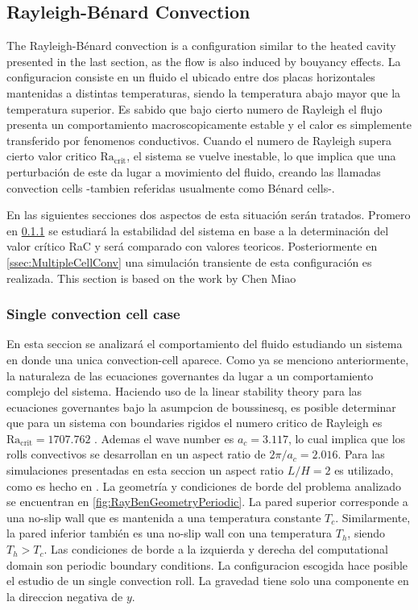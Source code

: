 \subsection{Rayleigh-Bénard Convection}

The Rayleigh-Bénard convection is a configuration similar to the heated cavity presented in the last section, as the flow is also induced by bouyancy effects. La configuracion consiste en un fluido el ubicado entre dos placas horizontales mantenidas a distintas temperaturas, siendo la temperatura abajo mayor que la temperatura superior. Es sabido que bajo cierto numero de Rayleigh el flujo presenta un comportamiento macroscopicamente estable y el calor es simplemente transferido por fenomenos conductivos. Cuando el numero de Rayleigh supera cierto valor critico $\text{Ra}_{\text{crit}}$, el sistema se vuelve inestable, lo que implica que una perturbación de este da lugar a movimiento del fluido, creando las llamadas convection cells -tambien referidas usualmente como Bénard cells-.

En las siguientes secciones dos aspectos de esta situación serán tratados. Promero en \cref{ssec:SingleCellConv} se estudiará la estabilidad del sistema en base a la determinación del valor crítico RaC y será comparado con valores teoricos. Posteriormente en \cref{ssec:MultipleCellConv} una simulación transiente de esta configuración es realizada. This section is based on the work by Chen Miao %
\subsubsection{Single convection cell case}\label{ssec:SingleCellConv}
En esta seccion se analizará el comportamiento del fluido estudiando un sistema en donde una unica convection-cell aparece. Como ya se menciono anteriormente, la naturaleza de las ecuaciones governantes da lugar a un comportamiento complejo del sistema. Haciendo uso de la linear stability theory para las ecuaciones governantes bajo la asumpcion de boussinesq, es posible determinar que para un sistema con boundaries rigidos el numero critico de Rayleigh es $\text{Ra}_{\text{crit}} = 1707.762$  \citep{chandrasekharHydrodynamicHydromagneticStability1961}. Ademas el wave number es $a_c =3.117$, lo cual implica que los rolls convectivos se desarrollan en un aspect ratio de $2\pi/a_c = 2.016$. Para las simulaciones presentadas en esta seccion un aspect ratio $L/H = 2$ es utilizado, como es hecho en \cite{kaoSimulatingOscillatoryFlows2007}. La geometría y condiciones de borde del problema analizado se encuentran en \cref{fig:RayBenGeometryPeriodic}. La pared superior corresponde a una no-slip wall que es mantenida a una temperatura constante $T_c$. Similarmente, la pared inferior también es una no-slip wall con una temperatura $T_h$, siendo $T_h > T_c$. Las condiciones de borde a la izquierda y derecha del computational domain son periodic boundary conditions. La configuracion escogida hace posible el estudio de un single convection roll. La gravedad tiene solo una componente en la direccion negativa de $y$. 


